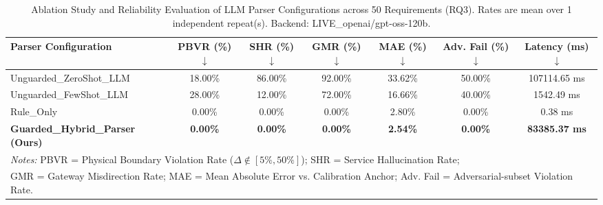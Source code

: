 \begin{table}[t]
\centering
\caption{Ablation Study and Reliability Evaluation of LLM Parser Configurations across 50 Requirements (RQ3).
Rates are mean over 1 independent repeat(s). Backend: LIVE\_openai/gpt-oss-120b.}
\label{tab:parser_ablation}
\begin{tabular}{lcccccc}
\toprule
\textbf{Parser Configuration} & \textbf{PBVR (\%)} $\downarrow$ & \textbf{SHR (\%)} $\downarrow$ & \textbf{GMR (\%)} $\downarrow$ & \textbf{MAE (\%)} $\downarrow$ & \textbf{Adv. Fail (\%)} $\downarrow$ & \textbf{Latency (ms)} $\downarrow$ \\
\midrule
Unguarded\_ZeroShot\_LLM & 18.00\% & 86.00\% & 92.00\% & 33.62\% & 50.00\% & 107114.65 ms \\
Unguarded\_FewShot\_LLM & 28.00\% & 12.00\% & 72.00\% & 16.66\% & 40.00\% & 1542.49 ms \\
Rule\_Only & 0.00\% & 0.00\% & 0.00\% & 2.80\% & 0.00\% & 0.38 ms \\
\textbf{Guarded\_Hybrid\_Parser (Ours)} & \textbf{0.00\%} & \textbf{0.00\%} & \textbf{0.00\%} & \textbf{2.54\%} & \textbf{0.00\%} & \textbf{83385.37 ms} \\
\bottomrule
\multicolumn{7}{l}{\footnotesize \textit{Notes:} PBVR = Physical Boundary Violation Rate ($\Delta \notin [5\%, 50\%]$); SHR = Service Hallucination Rate;} \\
\multicolumn{7}{l}{\footnotesize GMR = Gateway Misdirection Rate; MAE = Mean Absolute Error vs. Calibration Anchor; Adv. Fail = Adversarial-subset Violation Rate.}
\end{tabular}
\end{table}
